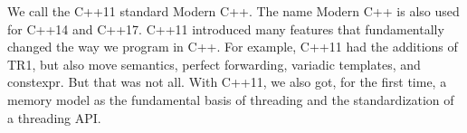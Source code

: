 

We call the C++11 standard Modern C++. The name Modern C++ is also used for C++14 and C++17. C++11 introduced many features that fundamentally changed the way we program in C++. For example, C++11 had the additions of TR1, but also move semantics, perfect forwarding, variadic templates, and constexpr. But that was not all. With C++11, we also got, for the first time, a memory model as the fundamental basis of threading and the standardization of a threading API.